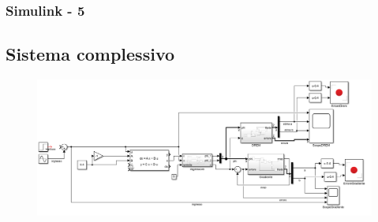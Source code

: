 \documentclass{beamer}
\begin{document}
\begin{frame}
	\frametitle{Simulink - 5}%
	\subsection{Sistema complessivo}
	\begin{figure}
		\includegraphics[scale=0.3]{2022-05-09-17-32-38.png} %
	\end{figure}
\end{frame}
\end{document}
